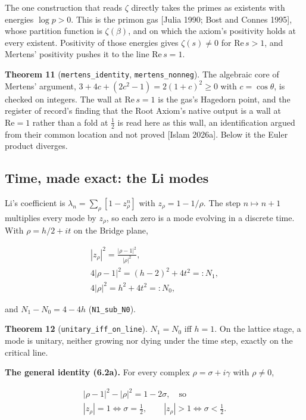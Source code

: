 \documentclass[10pt]{article}
\begin{document}
The one construction that reads \(\zeta\) directly takes the primes as
existents with energies \(\log p > 0\). This is the primon gas {[}Julia
1990; Bost and Connes 1995{]}, whose partition function is
\(\zeta(\beta)\), and on which the axiom's positivity holds at every
existent. Positivity of those energies gives \(\zeta(s) \neq 0\) for
\(\mathrm{Re}\, s > 1\), and Mertens' positivity pushes it to the line
\(\mathrm{Re}\, s = 1\).

\textbf{Theorem 11} (\texttt{mertens\_identity},
\texttt{mertens\_nonneg}). The algebraic core of Mertens' argument,
\(3 + 4c + (2c^2 - 1) = 2(1 + c)^2 \geq 0\) with \(c = \cos\theta\), is
checked on integers. The wall at \(\mathrm{Re}\, s = 1\) is the gas's
Hagedorn point, and the register of record's finding that the Root
Axiom's native output is a wall at \(\mathrm{Re} = 1\) rather than a
fold at \(\tfrac12\) is read here as this wall, an identification argued
from their common location and not proved {[}Islam 2026a{]}. Below it
the Euler product diverges.

\hypertarget{time-made-exact-the-li-modes}{%
\subsection{Time, made exact: the Li
modes}\label{time-made-exact-the-li-modes}}

Li's coefficient is \(\lambda_n = \sum_\rho [1 - z_\rho^n]\) with
\(z_\rho = 1 - 1/\rho\). The step \(n \mapsto n + 1\) multiplies every
mode by \(z_\rho\), so each zero is a mode evolving in a discrete time.
With \(\rho = h/2 + it\) on the Bridge plane,

\[\begin{gathered}|z_\rho|^2 = \frac{|\rho - 1|^2}{|\rho|^2}, \\ 4|\rho-1|^2 = (h-2)^2 + 4t^2 =: N_1, \\ 4|\rho|^2 = h^2 + 4t^2 =: N_0,\end{gathered}\]

and \(N_1 - N_0 = 4 - 4h\) (\texttt{N1\_sub\_N0}).

\textbf{Theorem 12} (\texttt{unitary\_iff\_on\_line}). \(N_1 = N_0\) iff
\(h = 1\). On the lattice stage, a mode is unitary, neither growing nor
dying under the time step, exactly on the critical line.

\textbf{The general identity (6.2a).} For every complex
\(\rho = \sigma + i\gamma\) with \(\rho \neq 0\),

\[\begin{gathered}|\rho - 1|^2 - |\rho|^2 = 1 - 2\sigma, \quad\text{so}\\ |z_\rho| = 1 \iff \sigma = \tfrac12, \qquad |z_\rho| > 1 \iff \sigma < \tfrac12.\end{gathered}\]
\end{document}
